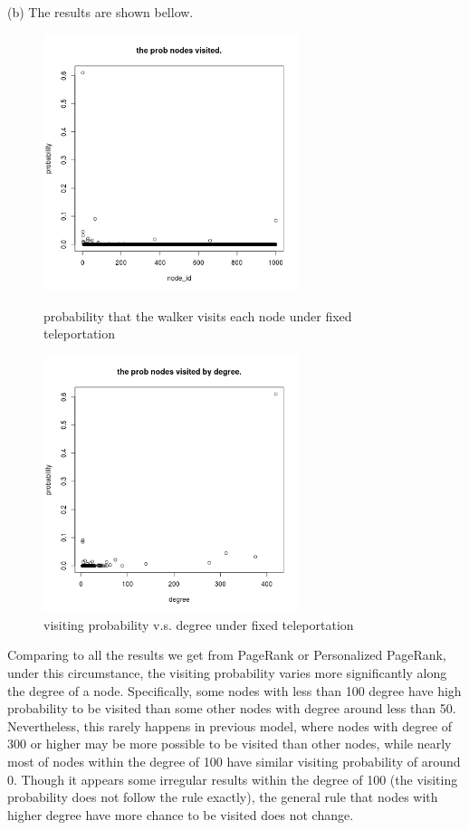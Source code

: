 \documentclass[draftcls,12pt,onecolumn]{IEEEtran}
\begin{document}
(b) The results are shown bellow.
\begin{figure}[htbp]
\centering
\begin{minipage}[t]{0.48\textwidth}
\centering
\includegraphics[width=7.5cm]{4_b_rw_prob.png}
\caption{probability that the walker visits each node under fixed teleportation}
\label{fig25}
\end{minipage}
\begin{minipage}[t]{0.48\textwidth}
\centering
\includegraphics[width=7.5cm]{4_b_rw_prob_by_degree.png}
\caption{visiting probability v.s. degree under fixed teleportation}
\label{fig26}
\end{minipage}
\end{figure}
Comparing to all the results we get from PageRank or Personalized PageRank, under this circumstance, the visiting probability varies more significantly along the degree of a node. Specifically, some nodes with less than 100 degree have high probability to be visited than some other nodes with degree around less than 50. Nevertheless, this rarely happens in previous model, where nodes with degree of 300 or higher may be more possible to be visited than other nodes, while nearly most of nodes within the degree of 100 have similar visiting probability of around 0. Though it appears some irregular results within the degree of 100 (the visiting probability does not follow the rule exactly), the general rule that nodes with higher degree have more chance to be visited does not change. 
\end{document}
